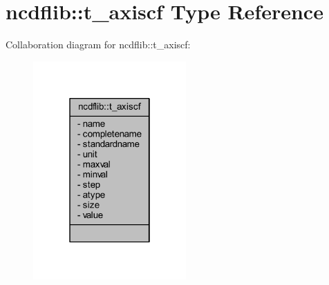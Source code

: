 \hypertarget{structncdflib_1_1t__axiscf}{}\section{ncdflib\+:\+:t\+\_\+axiscf Type Reference}
\label{structncdflib_1_1t__axiscf}


Collaboration diagram for ncdflib\+:\+:t\+\_\+axiscf\+:\nopagebreak
\begin{figure}[H]
\begin{center}
\leavevmode
\includegraphics[width=166pt]{structncdflib_1_1t__axiscf__coll__graph}
\end{center}
\end{figure}
